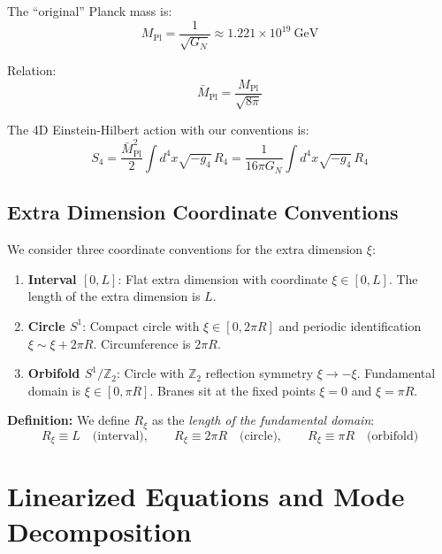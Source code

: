 \documentclass[11pt,a4paper]{article}
\newcommand{\Rxi}{R_\xi}
\newcommand{\Mpl}{M_{\mathrm{Pl}}}
\newcommand{\Mplbar}{\bar{M}_{\mathrm{Pl}}}
\newcommand{\GN}{G_N}
\begin{document}
The ``original'' Planck mass is:
\begin{equation}
\Mpl = \frac{1}{\sqrt{\GN}} \approx 1.221 \times 10^{19}~\mathrm{GeV}
\label{eq:Mpl-original}
\end{equation}

Relation:
\begin{equation}
\Mplbar = \frac{\Mpl}{\sqrt{8\pi}}
\label{eq:Mpl-relation}
\end{equation}

The 4D Einstein-Hilbert action with our conventions is:
\begin{equation}
S_4 = \frac{\Mplbar^2}{2} \int d^4x \sqrt{-g_4}\, R_4 = \frac{1}{16\pi\GN} \int d^4x \sqrt{-g_4}\, R_4
\label{eq:4D-action}
\end{equation}

\subsection{Extra Dimension Coordinate Conventions}

We consider three coordinate conventions for the extra dimension $\xi$:

\begin{enumerate}
\item \textbf{Interval $[0,L]$}: Flat extra dimension with coordinate $\xi \in [0,L]$.
The length of the extra dimension is $L$.

\item \textbf{Circle $S^1$}: Compact circle with $\xi \in [0, 2\pi R]$ and
periodic identification $\xi \sim \xi + 2\pi R$. Circumference is $2\pi R$.

\item \textbf{Orbifold $S^1/\mathbb{Z}_2$}: Circle with $\mathbb{Z}_2$ reflection
symmetry $\xi \to -\xi$. Fundamental domain is $\xi \in [0, \pi R]$. Branes sit
at the fixed points $\xi = 0$ and $\xi = \pi R$.
\end{enumerate}

\textbf{Definition:} We define $\Rxi$ as the \emph{length of the fundamental domain}:
\begin{equation}
\Rxi \equiv L \quad \text{(interval)}, \qquad
\Rxi \equiv 2\pi R \quad \text{(circle)}, \qquad
\Rxi \equiv \pi R \quad \text{(orbifold)}
\label{eq:Rxi-def}
\end{equation}

\section{Linearized Equations and Mode Decomposition}
\end{document}
